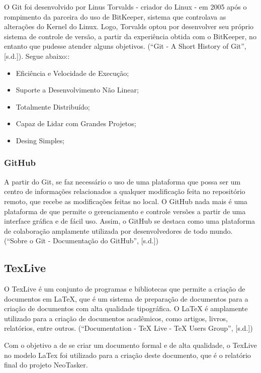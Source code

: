 \documentclass[a4paper,12pt]{article}
\begin{document}
O Git foi desenvolvido por Linus Torvalds - criador do Linux - em 2005 após o rompimento da parceira do uso de BitKeeper, sistema que controlava
as alterações do Kernel do Linux. Logo, Torvalds optou por desenvolver seu próprio sistema de controle de versão, a partir da experiência obtida com o BitKeeper, 
no entanto que pudesse atender alguns objetivos. (“Git - A Short History of Git”, [s.d.]). Segue abaixo::
\begin{itemize}
	\item Eficiência e Velocidade de Execução;
	\item Suporte a Desenvolvimento Não Linear;
	\item Totalmente Distribuído;
	\item Capaz de Lidar com Grandes Projetos;
	\item Desing Simples;
\end{itemize}


\subsubsection{GitHub}
A partir do Git, se faz necessário o uso de uma plataforma que possa ser um centro de informações relacionados a qualquer modificação feita no repositório remoto, 
que recebe as modificações feitas no local. O GitHub nada mais é uma plataforma de que permite o gerenciamento e controle versões a partir de uma interface gráfica 
e de fácil uso. Assim, o GitHub se destaca como uma plataforma de colaboração amplamente utilizada por desenvolvedores de todo mundo.
(“Sobre o Git - Documentação do GitHub”, [s.d.])

\subsection{TexLive}
O TexLive é um conjunto de programas e bibliotecas que permite a criação de documentos em LaTeX, que é um sistema de preparação de documentos para a criação de documentos
com alta qualidade tipográfica. O LaTeX é amplamente utilizado para a criação de documentos acadêmicos, como artigos, livros, relatórios, entre outros. (“Documentation - TeX Live - TeX Users Group”, [s.d.])

Com o objetivo a de se criar um documento formal e de alta qualidade, o TexLive no modelo LaTex foi utilizado para a criação deste documento, que é o relatório final do projeto NeoTasker.

\pagebreak
\end{document}
